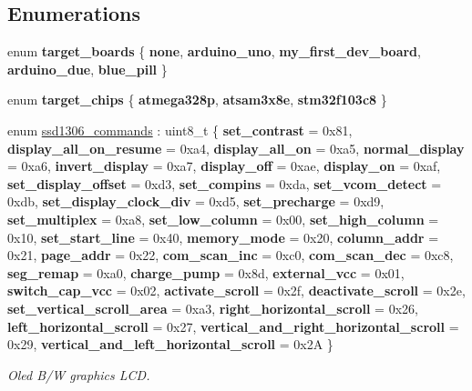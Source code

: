 \subsection*{Enumerations}
\begin{DoxyCompactItemize}
\item 
\mbox{\label{namespacehwlib_af5c9bdc7595e5d0d1029b166414de5d8}} 
enum {\bfseries target\+\_\+boards} \{ \newline
{\bfseries none}, 
{\bfseries arduino\+\_\+uno}, 
{\bfseries my\+\_\+first\+\_\+dev\+\_\+board}, 
{\bfseries arduino\+\_\+due}, 
\newline
{\bfseries blue\+\_\+pill}
 \}
\item 
\mbox{\label{namespacehwlib_ae17c8e1a280dac488d48368105c79b12}} 
enum {\bfseries target\+\_\+chips} \{ {\bfseries atmega328p}, 
{\bfseries atsam3x8e}, 
{\bfseries stm32f103c8}
 \}
\item 
enum \hyperlink{namespacehwlib_a9dcd26ad4dc21c1a72b57fb76f65e811}{ssd1306\+\_\+commands} \+: uint8\+\_\+t \{ \newline
{\bfseries set\+\_\+contrast} = 0x81, 
{\bfseries display\+\_\+all\+\_\+on\+\_\+resume} = 0xa4, 
{\bfseries display\+\_\+all\+\_\+on} = 0xa5, 
{\bfseries normal\+\_\+display} = 0xa6, 
\newline
{\bfseries invert\+\_\+display} = 0xa7, 
{\bfseries display\+\_\+off} = 0xae, 
{\bfseries display\+\_\+on} = 0xaf, 
{\bfseries set\+\_\+display\+\_\+offset} = 0xd3, 
\newline
{\bfseries set\+\_\+compins} = 0xda, 
{\bfseries set\+\_\+vcom\+\_\+detect} = 0xdb, 
{\bfseries set\+\_\+display\+\_\+clock\+\_\+div} = 0xd5, 
{\bfseries set\+\_\+precharge} = 0xd9, 
\newline
{\bfseries set\+\_\+multiplex} = 0xa8, 
{\bfseries set\+\_\+low\+\_\+column} = 0x00, 
{\bfseries set\+\_\+high\+\_\+column} = 0x10, 
{\bfseries set\+\_\+start\+\_\+line} = 0x40, 
\newline
{\bfseries memory\+\_\+mode} = 0x20, 
{\bfseries column\+\_\+addr} = 0x21, 
{\bfseries page\+\_\+addr} = 0x22, 
{\bfseries com\+\_\+scan\+\_\+inc} = 0xc0, 
\newline
{\bfseries com\+\_\+scan\+\_\+dec} = 0xc8, 
{\bfseries seg\+\_\+remap} = 0xa0, 
{\bfseries charge\+\_\+pump} = 0x8d, 
{\bfseries external\+\_\+vcc} = 0x01, 
\newline
{\bfseries switch\+\_\+cap\+\_\+vcc} = 0x02, 
{\bfseries activate\+\_\+scroll} = 0x2f, 
{\bfseries deactivate\+\_\+scroll} = 0x2e, 
{\bfseries set\+\_\+vertical\+\_\+scroll\+\_\+area} = 0xa3, 
\newline
{\bfseries right\+\_\+horizontal\+\_\+scroll} = 0x26, 
{\bfseries left\+\_\+horizontal\+\_\+scroll} = 0x27, 
{\bfseries vertical\+\_\+and\+\_\+right\+\_\+horizontal\+\_\+scroll} = 0x29, 
{\bfseries vertical\+\_\+and\+\_\+left\+\_\+horizontal\+\_\+scroll} = 0x2A
 \}\begin{DoxyCompactList}\small\item\em Oled B/W graphics L\+CD. \end{DoxyCompactList}
\end{DoxyCompactItemize}
